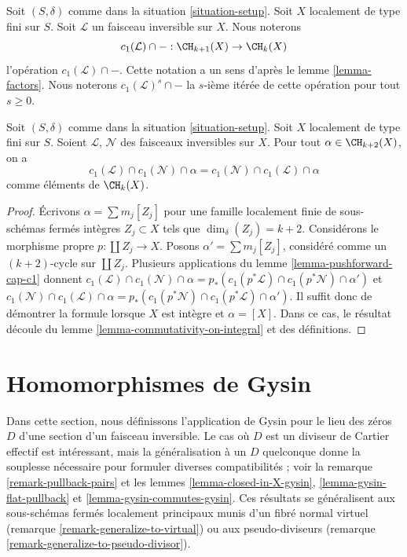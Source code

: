 \noindent
Soit $(S, \delta)$ comme dans la situation \ref{situation-setup}.
Soit $X$ localement de type fini sur $S$.
Soit $\mathcal{L}$ un faisceau inversible sur $X$.
Nous noterons
$$
c_1(\mathcal{L}) \cap - : \CH_{k + 1}(X) \to \CH_k(X)
$$
l'opération $c_1(\mathcal{L}) \cap - $. Cette notation a un sens d'après le
lemme \ref{lemma-factors}. Nous noterons $c_1(\mathcal{L})^s \cap -$
la $s$-ième itérée de cette opération pour tout $s \geq 0$.

\begin{lemma}
\label{lemma-cap-commutative}
Soit $(S, \delta)$ comme dans la situation \ref{situation-setup}.
Soit $X$ localement de type fini sur $S$.
Soient $\mathcal{L}$, $\mathcal{N}$ des faisceaux inversibles sur $X$.
Pour tout $\alpha \in \CH_{k + 2}(X)$, on a
$$
c_1(\mathcal{L}) \cap c_1(\mathcal{N}) \cap \alpha
=
c_1(\mathcal{N}) \cap c_1(\mathcal{L}) \cap \alpha
$$
comme éléments de $\CH_k(X)$.
\end{lemma}

\begin{proof}
Écrivons $\alpha = \sum m_j[Z_j]$ pour une famille localement finie
de sous-schémas fermés intègres $Z_j \subset X$
tels que $\dim_\delta(Z_j) = k + 2$.
Considérons le morphisme propre $p : \coprod Z_j \to X$.
Posons $\alpha' = \sum m_j[Z_j]$, considéré comme un $(k + 2)$-cycle sur
$\coprod Z_j$. Plusieurs applications du
lemme \ref{lemma-pushforward-cap-c1} donnent
$c_1(\mathcal{L}) \cap c_1(\mathcal{N}) \cap \alpha
= p_*(c_1(p^*\mathcal{L}) \cap c_1(p^*\mathcal{N}) \cap \alpha')$
et
$c_1(\mathcal{N}) \cap c_1(\mathcal{L}) \cap \alpha
= p_*(c_1(p^*\mathcal{N}) \cap c_1(p^*\mathcal{L}) \cap \alpha')$.
Il suffit donc de démontrer la formule lorsque $X$ est intègre
et $\alpha = [X]$. Dans ce cas, le résultat découle
du lemme \ref{lemma-commutativity-on-integral} et des définitions.
\end{proof}






\section{Homomorphismes de Gysin}
\label{section-intersecting-effective-Cartier}

\noindent
Dans cette section, nous définissons l'application de Gysin pour le lieu des zéros $D$ d'une
section d'un faisceau inversible. Le cas où $D$
est un diviseur de Cartier effectif est intéressant, mais la généralisation à un $D$ quelconque
donne la souplesse nécessaire pour formuler diverses compatibilités ; voir la
remarque \ref{remark-pullback-pairs} et les
lemmes \ref{lemma-closed-in-X-gysin}, \ref{lemma-gysin-flat-pullback} et
\ref{lemma-gysin-commutes-gysin}.
Ces résultats se généralisent aux sous-schémas fermés localement principaux
munis d'un fibré normal virtuel
(remarque \ref{remark-generalize-to-virtual}) ou aux
pseudo-diviseurs (remarque \ref{remark-generalize-to-pseudo-divisor}).

